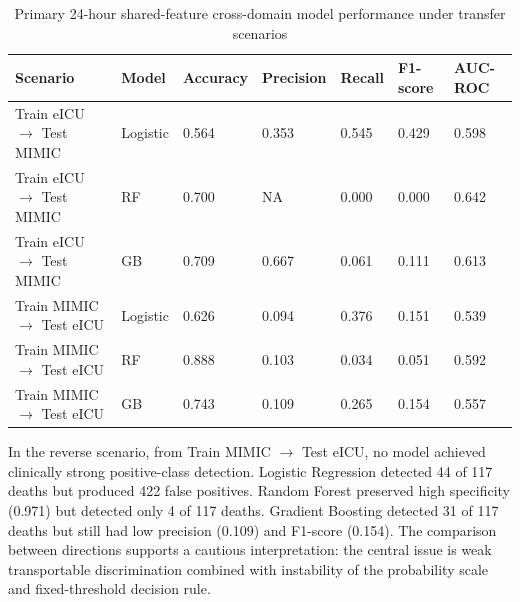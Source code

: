 \documentclass[utf8]{FrontiersinHarvard} %
\begin{document}
\begin{table}[h]
	\caption{Primary 24-hour shared-feature cross-domain model performance under transfer scenarios}
	\label{tab:cross_environment_transfer}
	\setlength{\tabcolsep}{3pt}
	\begin{tabular}{p{140pt}p{50pt}p{50pt}p{50pt}p{45pt}p{45pt}p{60pt}}
		\hline
		\textbf{Scenario} & \textbf{Model} & \textbf{Accuracy} & \textbf{Precision} & \textbf{Recall} & \textbf{F1-score} & \textbf{AUC-ROC} \\ \hline

		Train eICU $\rightarrow$ Test MIMIC & Logistic & 0.564 & 0.353 & 0.545 & 0.429 & 0.598 \\
		Train eICU $\rightarrow$ Test MIMIC & RF & 0.700 & NA & 0.000 & 0.000 & 0.642 \\
		Train eICU $\rightarrow$ Test MIMIC & GB & 0.709 & 0.667 & 0.061 & 0.111 & 0.613 \\

		Train MIMIC $\rightarrow$ Test eICU & Logistic & 0.626 & 0.094 & 0.376 & 0.151 & 0.539 \\
		Train MIMIC $\rightarrow$ Test eICU & RF & 0.888 & 0.103 & 0.034 & 0.051 & 0.592 \\
		Train MIMIC $\rightarrow$ Test eICU & GB & 0.743 & 0.109 & 0.265 & 0.154 & 0.557 \\ \hline

	\end{tabular}
	\footnotesize
\end{table}

In the reverse scenario, from Train MIMIC $\rightarrow$ Test eICU, no model achieved clinically strong positive-class detection. Logistic Regression detected 44 of 117 deaths but produced 422 false positives. Random Forest preserved high specificity (0.971) but detected only 4 of 117 deaths. Gradient Boosting detected 31 of 117 deaths but still had low precision (0.109) and F1-score (0.154). The comparison between directions supports a cautious interpretation: the central issue is weak transportable discrimination combined with instability of the probability scale and fixed-threshold decision rule.
\end{document}
